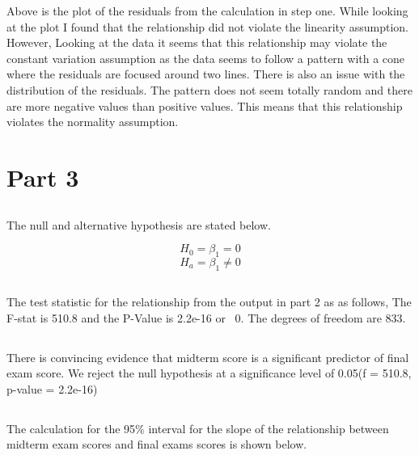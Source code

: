 \documentclass[letterpaper, onecolumn,10pt]{IEEEtran}
\begin{document}
             Above is the plot of the residuals from the calculation in step one. While looking at the plot I found that the relationship did not violate the linearity assumption. However, Looking at the data it seems that this relationship may violate the constant variation assumption as the data seems to follow a pattern with a cone where the residuals are focused around two lines. There is also an issue with the distribution of the residuals. The pattern does not seem totally random and there are more negative values than positive values. This means that this relationship violates the normality assumption.\\
        
        \section{Part 3}
            \subsection{}
            The null and alternative hypothesis are stated below.
            
            \[
                H_0 = \beta_1 = 0
            \]
            \[
                H_a =  \beta_1 \neq 0
            \]
            
            \subsection{}
            The test statistic for the relationship from the output in part 2 as as follows, The F-stat is 510.8 and the P-Value is 2.2e-16 or ~0. The degrees of freedom are 833.\\
            
            \subsection{}
            There is convincing evidence that midterm score is a significant predictor of final exam score. We reject the null hypothesis at a significance level of 0.05(f = 510.8, p-value = 2.2e-16)\\
            
            \subsection{}
            The calculation for the 95\% interval for the slope of the relationship between midterm exam scores and final exams scores is shown below.
            
\end{document}
